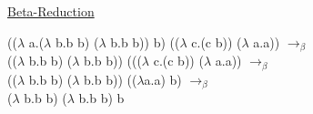\documentclass{article}
\begin{document}
\begin{center}
    \underline{Beta-Reduction}
\end{center}
\begin{center}
(($\lambda$ a.($\lambda$ b.b b) ($\lambda$ b.b b)) b) (($\lambda$ c.(c b)) ($\lambda$ a.a)) 
$\to_\beta$\\
(($\lambda$ b.b b) ($\lambda$ b.b b)) ((($\lambda$ c.(c b)) ($\lambda$ a.a))
$\to_\beta$\\
(($\lambda$ b.b b) ($\lambda$ b.b b)) (($\lambda$a.a) b)
$\to_\beta$\\
($\lambda$ b.b b) ($\lambda$ b.b b) b    
\end{center}
\end{document}
